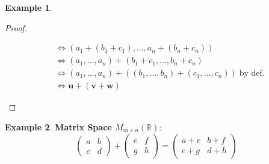 \documentclass{article}
\theoremstyle{plain}
\theoremstyle{definition}
\newtheorem{example}{Example}[section]
\theoremstyle{remark}
\newcommand{\thmheader}[1]{%
  \textcolor{#1}{\normalfont\bfseries}%
}
\begin{document}
\begin{example}
\begin{proof}
\begin{enumerate}[label=(V\arabic*),leftmargin=*]
\[\begin{aligned}
                                                           &\Leftrightarrow (a_1 + (b_1 + c_1), \ldots, a_n + (b_n + c_n)) \\
                                                           &\Leftrightarrow (a_1, \ldots, a_n) + (b_1 + c_1, \ldots, b_n + c_n) \\
                                                           &\Leftrightarrow (a_1, \ldots, a_n) + ((b_1, \ldots, b_n) + (c_1, \ldots, c_n)) \;\text{by def.} \\
                                                           &\Leftrightarrow \mathbf{u} + (\mathbf{v} + \mathbf{w})
                \end{aligned}
                \]
        \end{enumerate}
    \end{proof}
\end{example}

\begin{example}
\thmheader{excolor}\textbf{Matrix Space $M_{m \times n}(\mathbb{R})$}:
\[
\begin{pmatrix} a & b \\ c & d \end{pmatrix} + \begin{pmatrix} e & f \\ g & h \end{pmatrix} = \begin{pmatrix} a+e & b+f \\ c+g & d+h \end{pmatrix}
\]
\end{example}
\end{document}
